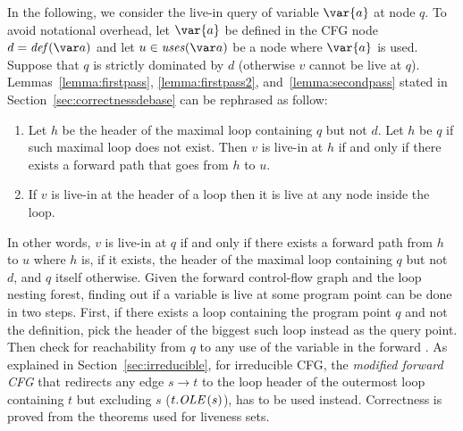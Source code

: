In the following, we consider the live-in query of variable $\var{a}$ at node $q$.
To avoid notational overhead, let $\var{a}$ be defined in the CFG node $d=\ldef{a}$ and let $u \in \luse{a}$ be a node where $\var{a}$ is used.
Suppose that $q$ is strictly dominated by $d$ (otherwise $v$ cannot be live at $q$).
Lemmas~\ref{lemma:firstpass}, \ref{lemma:firstpass2}, and~\ref{lemma:secondpass} stated in Section~\ref{sec:correctnessdebase} can be rephrased as follow:
\begin{enumerate}
\item
	Let $h$ be the header of the maximal loop containing $q$ but not $d$.
	Let $h$ be $q$ if such maximal loop does not exist.
	Then $v$ is live-in at $h$ if and only if there exists a forward path that goes from $h$ to $u$.
\item
	If $v$ is live-in at the header of a loop then it is live at any node inside the loop.
\end{enumerate}

In other words, $v$ is live-in at $q$ if and only if there exists a forward path from $h$ to $u$ where $h$ is, if it exists, the header of the maximal loop containing $q$ but not $d$, and $q$ itself otherwise.
Given the forward control-flow graph and the loop nesting forest, finding out if a variable is live at some program point can be done in two steps.
First, if there exists a loop containing the program point $q$ and not the definition, pick the header of the biggest such loop instead as the query point.
Then check for reachability from $q$ to any use of the variable in the forward \@CFG.
As explained in Section~\ref{sec:irreducible}, for irreducible CFG, the \emph{modified forward CFG} that redirects any edge $s\rightarrow t$ to the loop header of the outermost loop containing $t$ but excluding $s$ ($t.\textit{OLE}\,(s)$), has to be used instead.
Correctness is proved from the theorems used for liveness sets.

\newcommand{\BB}[1]{\textrm{basicBlock}(#1)}
\newcommand{\ordering}[1]{\textrm{order}(#1)}
\newcommand{\isLoopHeader}[1]{\textrm{isLoopHeader}(#1)}
\newcommand{\FR}[2]{\textrm{{\reduced}Reachable}(#1,#2)}

